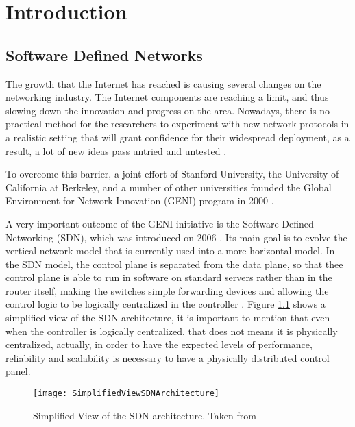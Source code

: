 \chapter{Introduction}
%

\section{Software Defined Networks}
%

The growth that the Internet has reached is causing several changes on the networking industry. The Internet components are reaching a limit, and thus slowing down the innovation and progress on the area. Nowadays, there is no practical method for the researchers to experiment with new network protocols in a realistic setting that will grant confidence for their widespread deployment, as a result, a lot of new ideas pass untried and untested \cite{mckeown2008openflow}.

To overcome this barrier, a joint effort of Stanford University, the University of California at Berkeley, and a number of other universities founded the Global Environment for Network Innovation (GENI) program in 2000 \cite{li2013software}.

A very important outcome of the GENI initiative is the Software Defined Networking (SDN), which was introduced on 2006 \cite{casado2006sane}. Its main goal is to evolve the vertical network model that is currently used into a more horizontal model. In the SDN model, the control plane is separated from the data plane, so that thee control plane is able to run in software on standard servers rather than in the router itself, making the switches simple forwarding devices and allowing the control logic to be logically centralized in the controller \cite{kreutz2015software}. Figure \ref{f:SDN_arch} shows a simplified view of the SDN architecture, it is important to mention that even when the controller is logically centralized, that does not means it is physically centralized, actually, in order to have the expected levels of performance, reliability and scalability is necessary to have a physically distributed control panel.


\begin{figure}[htb] %
	\begin{center}
 		\texttt{[image: SimplifiedViewSDNArchitecture]}
		\caption[Simplified View of the SDN architecture.]{Simplified View of the SDN architecture. Taken from \cite{kreutz2015software}}
		\label{f:SDN_arch}
	\end{center}
\end{figure} 


